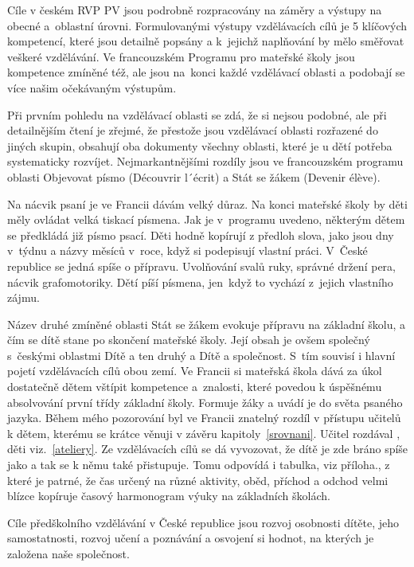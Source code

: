 	Cíle v českém RVP PV jsou podrobně rozpracovány na záměry a výstupy na obecné a oblastní úrovni. Formulovanými výstupy vzdělávacích cílů je 5 klíčových kompetencí, které jsou detailně popsány a k jejichž naplňování by mělo směřovat veškeré vzdělávání. Ve francouzském Programu pro mateřské školy jsou kompetence zmíněné též, ale jsou na konci každé vzdělávací oblasti a podobají se více našim očekávaným výstupům.

	Při prvním pohledu na vzdělávací oblasti se zdá, že si nejsou podobné, ale při detailnějším čtení je zřejmé, že přestože jsou vzdělávací oblasti rozřazené do jiných skupin, obsahují oba dokumenty všechny oblasti, které je u dětí potřeba systematicky rozvíjet. Nejmarkantnějšími rozdíly jsou ve francouzském programu oblasti Objevovat písmo (Découvrir l´écrit) a Stát se žákem (Devenir élève).

	Na nácvik psaní je ve Francii dávám velký důraz. Na konci mateřské školy by děti měly ovládat velká tiskací písmena. Jak je v programu uvedeno, některým dětem se předkládá již písmo psací. Děti hodně kopírují z předloh slova, jako jsou dny v týdnu a názvy měsíců v roce, když si podepisují vlastní práci. V České republice se jedná spíše o přípravu. Uvolňování svalů ruky, správné držení pera, nácvik grafomotoriky. Dětí píší písmena, jen když to vychází z jejich vlastního zájmu. 

	Název druhé zmíněné oblasti Stát se žákem evokuje přípravu na základní školu, a čím se dítě stane po skončení mateřské školy. Její obsah je ovšem společný s českými oblastmi Dítě a ten druhý a Dítě a společnost. S tím souvisí i hlavní pojetí vzdělávacích cílů obou zemí. Ve Francii si mateřská škola dává za úkol dostatečně dětem vštípit kompetence a znalosti, které povedou k úspěšnému absolvování první třídy základní školy. Formuje žáky a uvádí je do světa psaného jazyka. Během mého pozorování byl ve Francii znatelný rozdíl v přístupu učitelů k dětem, kterému se krátce věnuji v závěru kapitoly~\ref{srovnani}. Učitel rozdával , děti  viz.~\ref{ateliery}. Ze vzdělávacích cílů se dá vyvozovat, že dítě je zde bráno spíše jako  a tak se k němu také přistupuje. Tomu odpovídá i tabulka, viz příloha., z které je patrné, že čas určený na různé aktivity, oběd, příchod a odchod velmi blízce kopíruje časový harmonogram výuky na základních školách. 

	Cíle předškolního vzdělávání v České republice jsou rozvoj osobnosti dítěte, jeho samostatnosti, rozvoj učení a poznávání a osvojení si hodnot, na kterých je založena naše společnost. 
